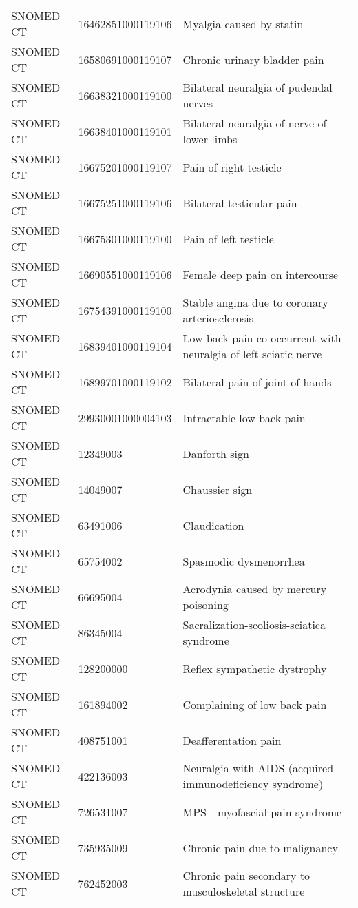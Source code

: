 \begin{longtable}{p{}p{}p{}}
  SNOMED CT & 16462851000119106 & Myalgia caused by statin \\ 
  SNOMED CT & 16580691000119107 & Chronic urinary bladder pain \\ 
  SNOMED CT & 16638321000119100 & Bilateral neuralgia of pudendal nerves \\ 
  SNOMED CT & 16638401000119101 & Bilateral neuralgia of nerve of lower limbs \\ 
  SNOMED CT & 16675201000119107 & Pain of right testicle \\ 
  SNOMED CT & 16675251000119106 & Bilateral testicular pain \\ 
  SNOMED CT & 16675301000119100 & Pain of left testicle \\ 
  SNOMED CT & 16690551000119106 & Female deep pain on intercourse \\ 
  SNOMED CT & 16754391000119100 & Stable angina due to coronary arteriosclerosis \\ 
  SNOMED CT & 16839401000119104 & Low back pain co-occurrent with neuralgia of left sciatic nerve \\ 
  SNOMED CT & 16899701000119102 & Bilateral pain of joint of hands \\ 
  SNOMED CT & 29930001000004103 & Intractable low back pain \\ 
  SNOMED CT & 12349003 & Danforth sign \\ 
  SNOMED CT & 14049007 & Chaussier sign \\ 
  SNOMED CT & 63491006 & Claudication \\ 
  SNOMED CT & 65754002 & Spasmodic dysmenorrhea \\ 
  SNOMED CT & 66695004 & Acrodynia caused by mercury poisoning \\ 
  SNOMED CT & 86345004 & Sacralization-scoliosis-sciatica syndrome \\ 
  SNOMED CT & 128200000 & Reflex sympathetic dystrophy \\ 
  SNOMED CT & 161894002 & Complaining of low back pain \\ 
  SNOMED CT & 408751001 & Deafferentation pain \\ 
  SNOMED CT & 422136003 & Neuralgia with AIDS (acquired immunodeficiency syndrome) \\ 
  SNOMED CT & 726531007 & MPS - myofascial pain syndrome \\ 
  SNOMED CT & 735935009 & Chronic pain due to malignancy \\ 
  SNOMED CT & 762452003 & Chronic pain secondary to musculoskeletal structure \\ 

\end{longtable}
